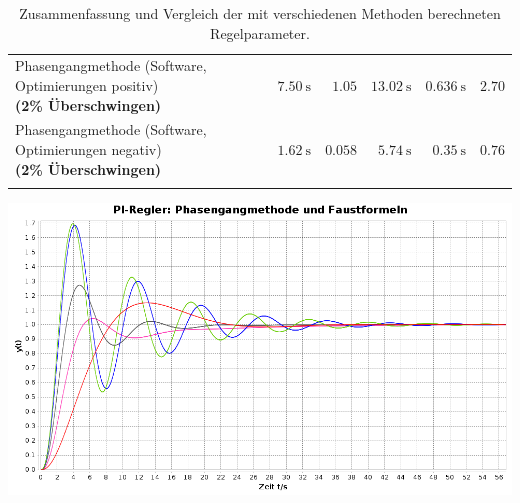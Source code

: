 \begin{longtable}{p{85mm}rrrrr}
    \addlinespace[0.5em]

    \pbox{84mm}{Phasengangmethode (Software, Optimierungen positiv) \\ \small{\textbf{(2\% \"Uberschwingen)}} \\}
    &
    $\SI{7.50}{\second}$
    &
    $1.05$
    &
    $\SI{13.02}{\second}$
    &
    $\SI{0.636}{\second}$
    &
    $2.70$
    \\

    \addlinespace[0.5em]

    \pbox{84mm}{Phasengangmethode (Software, Optimierungen negativ) \\ \small{\textbf{(2\% \"Uberschwingen)}} \\}
    &
    $\SI{1.62}{\second}$
    &
    $0.058$
    &
    $\SI{5.74}{\second}$
    &
    $\SI{0.35}{\second}$
    &
    $0.76$
    \\

    \addlinespace[0.5em]


    \bottomrule
    \caption{%
        Zusammenfassung   und  Vergleich   der   mit  verschiedenen   Methoden
        berechneten Regelparameter.
    }
\label{tab:allresults}
\end{longtable}


\begin{minipage}[c][][b]{.75\textwidth}
    \includegraphics[width=\textwidth]{images/comparisonPI015.png}
\end{minipage}
\begin{minipage}[c][][b]{.22\textwidth}
    \label{fig:comparisonPI015}
\end{minipage}

